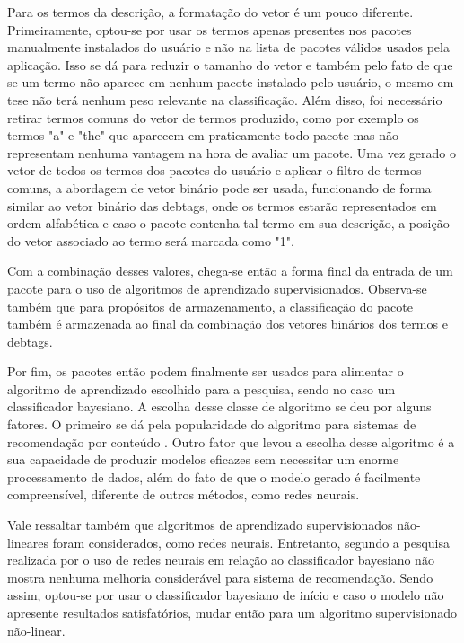 Para os termos da descrição, a formatação do vetor é um pouco diferente. Primeiramente, optou-se por usar os termos apenas presentes
nos pacotes manualmente instalados do usuário e não na lista de pacotes válidos
usados pela aplicação. Isso se dá para reduzir o tamanho do vetor e também
pelo fato de que se um termo não aparece em nenhum pacote instalado pelo usuário, o mesmo em tese não terá nenhum peso relevante na
classificação. Além disso, foi necessário retirar termos comuns do vetor de termos produzido, como por exemplo os termos "a" e "the" que
aparecem em praticamente todo pacote mas não representam nenhuma vantagem na hora de avaliar um pacote. Uma vez gerado o vetor de todos os
termos dos pacotes do usuário e aplicar o filtro de termos comuns, a abordagem de vetor binário pode ser usada, funcionando de forma
similar ao vetor binário das debtags, onde os termos estarão representados em ordem alfabética e caso o pacote contenha tal termo em sua
descrição, a posição do vetor associado ao termo será marcada como "1".

Com a combinação desses valores, chega-se então a forma final da entrada de um pacote para o uso de algoritmos de aprendizado
supervisionados. Observa-se também que para propósitos de armazenamento, a classificação do pacote também é armazenada ao final da combinação
dos vetores binários dos termos e debtags.

Por fim, os pacotes então podem finalmente ser usados para alimentar o algoritmo de aprendizado escolhido para a pesquisa, sendo no caso um
classificador bayesiano. A escolha desse classe de algoritmo se deu por alguns fatores. O primeiro se dá pela popularidade do algoritmo para
sistemas de recomendação por conteúdo \cite{amatriain2011data}. Outro fator que levou a escolha desse algoritmo é a sua capacidade de produzir
modelos eficazes sem necessitar um enorme processamento de dados, além do fato
de que o modelo gerado é facilmente compreensível, diferente de outros métodos,
como redes neurais\cite{segaran2007programming}.

Vale ressaltar também que algoritmos de aprendizado supervisionados não-lineares foram considerados, como redes neurais. Entretanto, segundo
a pesquisa realizada por \cite{pazzani1997learning} o uso de redes neurais em relação ao classificador bayesiano não mostra nenhuma melhoria
considerável para sistema de recomendação. Sendo assim, optou-se por usar o classificador bayesiano de início e caso o modelo não apresente
resultados satisfatórios, mudar então para um algoritmo supervisionado não-linear.

